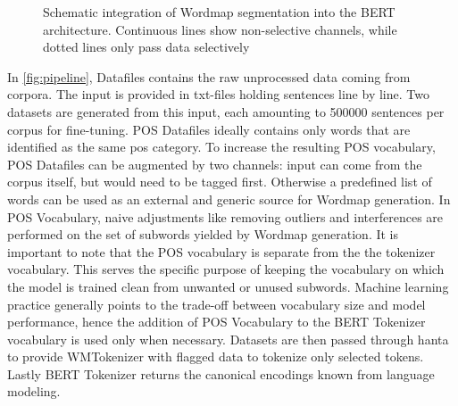 \begin{figure}
    \caption[Schematic integration of Wordmap segmentation into the BERT architecture.]{Schematic integration of Wordmap segmentation into the BERT architecture. Continuous lines show non-selective channels, while dotted lines only pass data selectively}
    \label{fig:pipeline}
\end{figure}

In \autoref{fig:pipeline}, Datafiles contains the raw unprocessed data coming from corpora.
The input is provided in txt-files holding sentences line by line.
Two datasets are generated from this input, each amounting to 500000 sentences per corpus for fine-tuning.
POS Datafiles ideally contains only words that are identified as the same \ac{pos} category.
To increase the resulting POS vocabulary, POS Datafiles can be augmented by two channels: input can come from the corpus itself, but would need to be tagged first.
Otherwise a predefined list of words can be used as an external and generic source for Wordmap generation.
In POS Vocabulary, naive adjustments like removing outliers and interferences are performed on the set of subwords yielded by Wordmap generation.
It is important to note that the POS vocabulary is separate from the the tokenizer vocabulary.
This serves the specific purpose of keeping the vocabulary on which the model is trained clean from unwanted or unused subwords.
Machine learning practice generally points to the trade-off between vocabulary size and model performance, hence the addition of POS Vocabulary to the BERT Tokenizer vocabulary is used only when necessary.
Datasets are then passed through \ac{hanta} to provide WMTokenizer with flagged data to tokenize only selected tokens.
Lastly BERT Tokenizer returns the canonical encodings known from language modeling.

